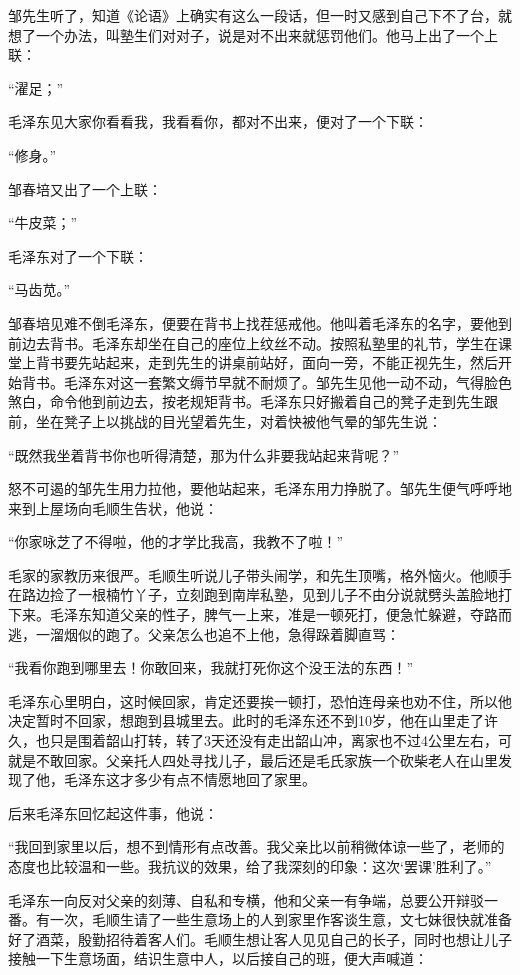\documentclass[../../dazhuan.tex]{subfiles}
\begin{document}
邹先生听了，知道《论语》上确实有这么一段话，但一时又感到自己下不了台，就想了一个办法，叫塾生们对对子，说是对不出来就惩罚他们。他马上出了一个上联：

“濯足；”

毛泽东见大家你看看我，我看看你，都对不出来，便对了一个下联：

“修身。”

邹春培又出了一个上联：

“牛皮菜；”

毛泽东对了一个下联：

“马齿苋。”

邹春培见难不倒毛泽东，便要在背书上找茬惩戒他。他叫着毛泽东的名字，要他到前边去背书。毛泽东却坐在自己的座位上纹丝不动。按照私塾里的礼节，学生在课堂上背书要先站起来，走到先生的讲桌前站好，面向一旁，不能正视先生，然后开始背书。毛泽东对这一套繁文缛节早就不耐烦了。邹先生见他一动不动，气得脸色煞白，命令他到前边去，按老规矩背书。毛泽东只好搬着自己的凳子走到先生跟前，坐在凳子上以挑战的目光望着先生，对着快被他气晕的邹先生说：

“既然我坐着背书你也听得清楚，那为什么非要我站起来背呢？”

怒不可遏的邹先生用力拉他，要他站起来，毛泽东用力挣脱了。邹先生便气呼呼地来到上屋场向毛顺生告状，他说：

“你家咏芝了不得啦，他的才学比我高，我教不了啦！”

毛家的家教历来很严。毛顺生听说儿子带头闹学，和先生顶嘴，格外恼火。他顺手在路边捡了一根楠竹丫子，立刻跑到南岸私塾，见到儿子不由分说就劈头盖脸地打下来。毛泽东知道父亲的性子，脾气一上来，准是一顿死打，便急忙躲避，夺路而逃，一溜烟似的跑了。父亲怎么也追不上他，急得跺着脚直骂：

“我看你跑到哪里去！你敢回来，我就打死你这个没王法的东西！”

毛泽东心里明白，这时候回家，肯定还要挨一顿打，恐怕连母亲也劝不住，所以他决定暂时不回家，想跑到县城里去。此时的毛泽东还不到10岁，他在山里走了许久，也只是围着韶山打转，转了3天还没有走出韶山冲，离家也不过4公里左右，可就是不敢回家。父亲托人四处寻找儿子，最后还是毛氏家族一个砍柴老人在山里发现了他，毛泽东这才多少有点不情愿地回了家里。

后来毛泽东回忆起这件事，他说：

“我回到家里以后，想不到情形有点改善。我父亲比以前稍微体谅一些了，老师的态度也比较温和一些。我抗议的效果，给了我深刻的印象：这次‘罢课’胜利了。”

毛泽东一向反对父亲的刻薄、自私和专横，他和父亲一有争端，总要公开辩驳一番。有一次，毛顺生请了一些生意场上的人到家里作客谈生意，文七妹很快就准备好了酒菜，殷勤招待着客人们。毛顺生想让客人见见自己的长子，同时也想让儿子接触一下生意场面，结识生意中人，以后接自己的班，便大声喊道：
\end{document}
